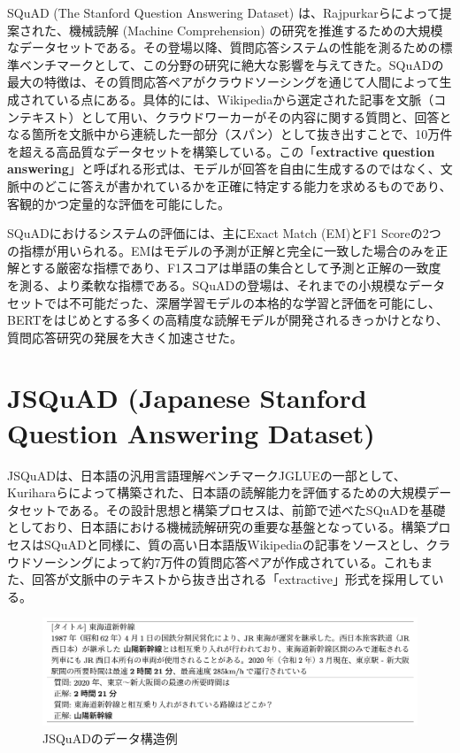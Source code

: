 \documentclass[a4paper,11pt]{jreport}
\begin{document}
SQuAD (The Stanford Question Answering Dataset) は、Rajpurkarらによって提案された\cite{SQuAD}、機械読解 (Machine Comprehension) の研究を推進するための大規模なデータセットである。その登場以降、質問応答システムの性能を測るための標準ベンチマークとして、この分野の研究に絶大な影響を与えてきた。SQuADの最大の特徴は、その質問応答ペアがクラウドソーシングを通じて人間によって生成されている点にある。具体的には、Wikipediaから選定された記事を文脈（コンテキスト）として用い、クラウドワーカーがその内容に関する質問と、回答となる箇所を文脈中から連続した一部分（スパン）として抜き出すことで、10万件を超える高品質なデータセットを構築している。この「\textbf{extractive question answering}」と呼ばれる形式は、モデルが回答を自由に生成するのではなく、文脈中のどこに答えが書かれているかを正確に特定する能力を求めるものであり、客観的かつ定量的な評価を可能にした。

SQuADにおけるシステムの評価には、主にExact Match (EM)とF1 Scoreの2つの指標が用いられる\cite{SQuAD}。EMはモデルの予測が正解と完全に一致した場合のみを正解とする厳密な指標であり、F1スコアは単語の集合として予測と正解の一致度を測る、より柔軟な指標である。SQuADの登場は、それまでの小規模なデータセットでは不可能だった、深層学習モデルの本格的な学習と評価を可能にし、BERT\cite{BERT}をはじめとする多くの高精度な読解モデルが開発されるきっかけとなり、質問応答研究の発展を大きく加速させた。



\section{JSQuAD (Japanese Stanford Question Answering Dataset)}
\label{sec:jsquad}

JSQuADは、日本語の汎用言語理解ベンチマークJGLUE\cite{JGLUE}の一部として、Kuriharaらによって構築された、日本語の読解能力を評価するための大規模データセットである。その設計思想と構築プロセスは、前節で述べたSQuAD\cite{SQuAD}を基礎としており、日本語における機械読解研究の重要な基盤となっている。構築プロセスはSQuADと同様に、質の高い日本語版Wikipediaの記事をソースとし、クラウドソーシングによって約7万件の質問応答ペアが作成されている。これもまた、回答が文脈中のテキストから抜き出される「extractive」形式を採用している。

\begin{figure}[t]
  \centering
  \includegraphics[width=0.9\linewidth]{./fig/jsquad.png}
  \caption{JSQuADのデータ構造例\cite{JGLUE}}
  \label{fig:jsquad_example}
\end{figure}
\end{document}
